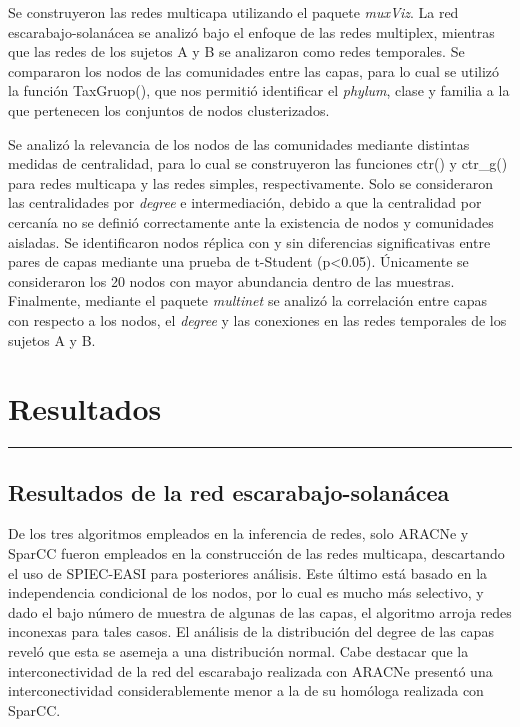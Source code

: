 \documentclass[
]{book}
\begin{document}
Se construyeron las redes multicapa utilizando el paquete \emph{muxViz}. La red escarabajo-solanácea se analizó bajo el enfoque de las redes multiplex, mientras que las redes de los sujetos A y B se analizaron como redes temporales. Se compararon los nodos de las comunidades entre las capas, para lo cual se utilizó la función TaxGruop(), que nos permitió identificar el \emph{phylum}, clase y familia a la que pertenecen los conjuntos de nodos clusterizados.

Se analizó la relevancia de los nodos de las comunidades mediante distintas medidas de centralidad, para lo cual se construyeron las funciones ctr() y ctr\_g() para redes multicapa y las redes simples, respectivamente. Solo se consideraron las centralidades por \emph{degree} e intermediación, debido a que la centralidad por cercanía no se definió correctamente ante la existencia de nodos y comunidades aisladas. Se identificaron nodos réplica con y sin diferencias significativas entre pares de capas mediante una prueba de t-Student (p\textless0.05). Únicamente se consideraron los 20 nodos con mayor abundancia dentro de las muestras. Finalmente, mediante el paquete \emph{multinet} \citep{multinet} se analizó la correlación entre capas con respecto a los nodos, el \emph{degree} y las conexiones en las redes temporales de los sujetos A y B.

\hypertarget{resultados}{%
\chapter*{Resultados}\label{resultados}}

\begin{center}\rule{0.5\linewidth}{0.5pt}\end{center}

\hypertarget{resultados-de-la-red-escarabajo-solanuxe1cea}{%
\section*{Resultados de la red escarabajo-solanácea}\label{resultados-de-la-red-escarabajo-solanuxe1cea}}

De los tres algoritmos empleados en la inferencia de redes, solo ARACNe y SparCC fueron empleados en la construcción de las redes multicapa, descartando el uso de SPIEC-EASI para posteriores análisis. Este último está basado en la independencia condicional de los nodos, por lo cual es mucho más selectivo, y dado el bajo número de muestra de algunas de las capas, el algoritmo arroja redes inconexas para tales casos. El análisis de la distribución del degree de las capas reveló que esta se asemeja a una distribución normal. Cabe destacar que la interconectividad de la red del escarabajo realizada con ARACNe presentó una interconectividad considerablemente menor a la de su homóloga realizada con SparCC.
\end{document}
